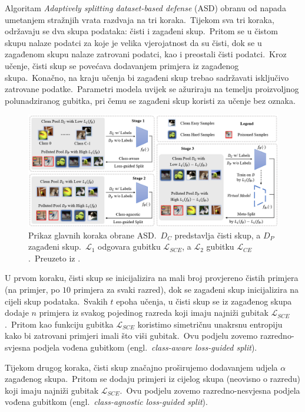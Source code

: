 \documentclass[diplomskirad]{fer}
\begin{document}
Algoritam \textit{Adaptively splitting dataset-based defense} (ASD) obranu od napada umetanjem stražnjih vrata razdvaja na tri koraka.\ 
Tijekom sva tri koraka, održavaju se dva skupa podataka: čisti i zagađeni skup.\ Pritom se u čistom skupu nalaze podatci za koje je velika vjerojatnost da su čisti, dok se u zagađenom skupu nalaze zatrovani podatci, kao i preostali čisti podatci.\ 
Kroz učenje, čisti skup se povećava dodavanjem primjera iz zagađenog skupa.\ Konačno, na kraju učenja bi zagađeni skup trebao sadržavati isključivo zatrovane podatke.\ 
Parametri modela uvijek se ažuriraju na temelju proizvoljnog polunadziranog gubitka, pri čemu se zagađeni skup koristi za učenje bez oznaka.\   

\begin{figure}[h]
  \centering
  \includegraphics[scale=0.65]{./Slike/asd.png}
  \caption{Prikaz glavnih koraka obrane ASD.\ $D_C$ predstavlja čisti skup, a $D_P$ zagađeni skup.\ $\mathcal{L}_1$ odgovara gubitku $\mathcal{L}_{SCE}$, a $\mathcal{L}_2$ gubitku $\mathcal{L}_{CE}$.\ Preuzeto iz \cite{gao2023backdoor}.}
  \label{fig:asd}
\end{figure}
  
U prvom koraku, čisti skup se inicijalizira na mali broj provjereno čistih primjera (na primjer, po $10$ primjera za svaki razred), dok se zagađeni skup inicijalizira na cijeli skup podataka.\ 
Svakih $t$ epoha učenja, u čisti skup se iz zagađenog skupa dodaje $n$ primjera iz svakog pojedinog razreda koji imaju najniži gubitak $\mathcal{L}_{SCE}$.\ Pritom kao funkciju gubitka $\mathcal{L}_{SCE}$ koristimo simetričnu unakrsnu entropiju kako bi zatrovani primjeri imali što viši gubitak.\ 
Ovu podjelu zovemo razredno-svjesna podjela vođena gubitkom (engl.\ \textit{class-aware loss-guided split}).\ 
  
Tijekom drugog koraka, čisti skup značajno proširujemo dodavanjem udjela $\alpha$ zagađenog skupa.\ 
Pritom se dodaju primjeri iz cijelog skupa (neovisno o razredu) koji imaju najniži gubitak $\mathcal{L}_{SCE}$.\ 
Ovu podjelu zovemo razredno-nesvjesna podjela vođena gubitkom (engl.\ \textit{class-agnostic loss-guided split}).\ 
  
\end{document}
